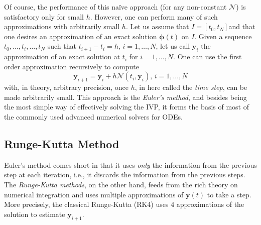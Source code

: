 Of course, the performance of this naïve approach (for any non-constant $\mathcal{N}$) is satisfactory only for small $h$.
However, one can perform many of such approximations with arbitrarily small $h$.
Let us assume that $I=\left[ t_0,t_N \right]$\footnotemark and that one desires an approximation of an exact solution $\bm{\phi}\left( t \right) $ on $I$.
Given a sequence $t_0,\ldots,t_i,\ldots,t_N$ such that $t_{i+1}-t_i=h,\,i=1,\ldots,N$, let us call $\bm{y}_{i}$ the approximation of an exact solution at $t_i$ for $i=1,\ldots,N$.
One can use the first order approximation recursively to compute \[
\bm{y}_{i+1} = \bm{y}_{i} + h\mathcal{N}\left( t_i, \bm{y}_i \right),\,i=1,\ldots,N
\] with, in theory, arbitrary precision, once $h$, in here called the \emph{time step}, can be made arbitrarily small.\cite{iserles_first_2008}
This approach is the \emph{Euler's method}, and besides being the most simple way of effectively solving the \gls{IVP}, it forms the basis of most of the commonly used advanced numerical solvers for \gls{ODE}s.

\subsection{Runge-Kutta Method}

Euler's method comes short in that it uses \emph{only} the information from the previous step at each iteration, i.e., it discards the information from the previous steps.
The \emph{Runge-Kutta methods}, on the other hand, feeds from the rich theory on numerical integration and uses multiple approximations of $\bm{y}\left( t \right)$ to take a step.
More precisely, the classical Runge-Kutta (RK4) uses 4 approximations of the solution to estimate $\bm{y}_{i+1}$.

